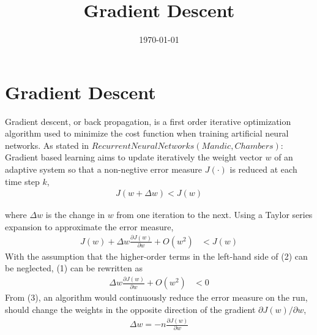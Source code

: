 \documentclass[a4paper, 12pt]{article}
\begin{document}
\title{Gradient Descent}
\date{\today}
\pagestyle{empty} 
\section*{Gradient Descent}
	Gradient descent, or back propagation, is a first order iterative optimization algorithm used to minimize the cost function when training artificial neural networks.  As stated in $Recurrent Neural Networks (Mandic, Chambers)$:\\
	
	Gradient based learning aims to update iteratively the weight vector $w$ of an adaptive system so that a non-negtive error measure $J(\cdot)$ is reduced at each time step $k$,
\begin{align}
J(w + \Delta w) < J(w)
\end{align}

where $\Delta w$ is the change in $w$ from one iteration to the next.  Using a Taylor series expansion to approximate the error measure,
\begin{align}
J(w) + \Delta w \frac{\partial J(w)}{\partial w} + O(w^2) &< J(w)
\end{align}
With the assumption that the higher-order terms in the left-hand side of (2) can be neglected, (1) can be rewritten as
\begin{align}
\Delta w \frac{\partial J(w)}{\partial w} + O(w^2) &< 0
\end{align}
From (3), an algorithm would continuously reduce the error measure on the run, should change the weights in the opposite direction of the gradient $\partial J(w) / \partial w$, 
\begin{align}
\Delta w = -n\frac{\partial J(w)}{\partial w}
\end{align}
\end{document}
